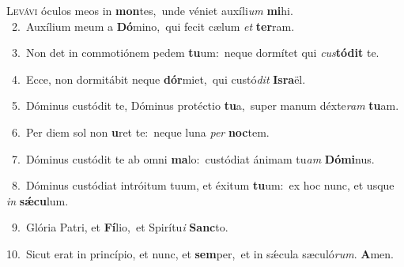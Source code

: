 \lettrine{\initial\textcolor{\initialcolor}{L}}{evávi} óculos meos in \textbf{mon}\-tes,~\star unde véniet auxíli\textit{um} \textbf{mi}\-hi.\\
{\numbfont\textcolor{\numbcolor}{~2.}}~Auxílium meum a \textbf{Dó}\-mino,~\star qui fecit cælum \textit{et} \textbf{ter}\-ram.\par
{\numbfont\textcolor{\numbcolor}{~3.}}~Non det in commotiónem pedem \textbf{tu}\-um:~\star neque dormítet qui \textit{cus}\-\textbf{tó}\textbf{dit} te.\par
{\numbfont\textcolor{\numbcolor}{~4.}}~Ecce, non dormitábit neque \textbf{dór}\-miet,~\star qui custó\textit{dit} \textbf{Is}\-\textbf{ra}ël.\par
{\numbfont\textcolor{\numbcolor}{~5.}}~Dóminus custódit te, Dóminus protéctio \textbf{tu}\-a,~\star super manum déxte\textit{ram} \textbf{tu}\-am.\par
{\numbfont\textcolor{\numbcolor}{~6.}}~Per diem sol non \textbf{u}\-ret te:~\star neque luna \textit{per} \textbf{noc}\-tem.\par
{\numbfont\textcolor{\numbcolor}{~7.}}~Dóminus custódit te ab omni \textbf{ma}\-lo:~\star custódiat ánimam tu\textit{am} \textbf{Dó}\-\textbf{mi}nus.\par
{\numbfont\textcolor{\numbcolor}{~8.}}~Dóminus custódiat intróitum tuum, et éxitum \textbf{tu}\-um:~\star ex hoc nunc, et usque \textit{in} \textbf{sǽ}\-\textbf{cu}lum.\par
{\numbfont\textcolor{\numbcolor}{~9.}}~Glória Patri, et \textbf{Fí}\-lio,~\star et Spirítu\textit{i} \textbf{Sanc}\-to.\par
{\numbfont\textcolor{\numbcolor}{10.}}~Sicut erat in princípio, et nunc, et \textbf{sem}\-per,~\star et in sǽcula sæculó\-\textit{rum}\-. \textbf{A}\-men.\par
